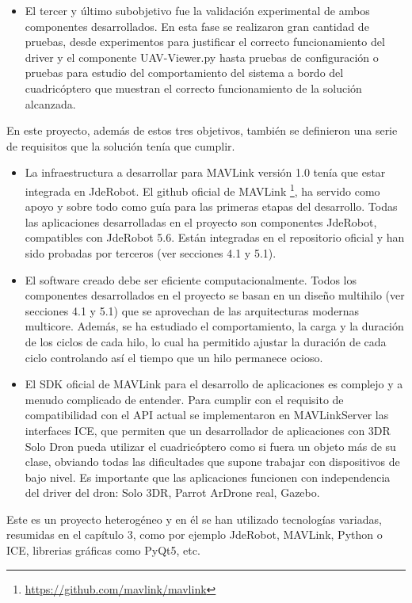 \begin{itemize}
\item El tercer y último subobjetivo fue la validación experimental de ambos componentes desarrollados. En esta fase se realizaron gran cantidad de pruebas, desde experimentos para justificar el correcto funcionamiento del driver y el componente UAV-Viewer.py hasta pruebas de configuración o pruebas para estudio del comportamiento del sistema a bordo del cuadricóptero que muestran el correcto funcionamiento de la solución alcanzada.

\end{itemize}

En este proyecto, además de estos tres objetivos, también se definieron una serie de requisitos que la solución tenía que cumplir.

\begin{itemize}
\item La infraestructura a desarrollar para MAVLink versión 1.0 tenía que estar integrada en JdeRobot. El github oficial de MAVLink \footnote{\url{https://github.com/mavlink/mavlink}}, ha servido como apoyo y sobre todo como guía para las primeras etapas del desarrollo. Todas las aplicaciones desarrolladas en el proyecto son componentes JdeRobot, compatibles con JdeRobot 5.6. Están integradas en el repositorio oficial y han sido probadas por terceros (ver secciones 4.1 y 5.1).
\item El software creado debe ser eficiente computacionalmente. Todos los componentes desarrollados en el proyecto se basan en un diseño multihilo (ver secciones 4.1 y 5.1) que se aprovechan de las arquitecturas modernas multicore. Además, se ha estudiado el comportamiento, la carga y la duración de los ciclos de cada hilo, lo cual ha permitido ajustar la duración de cada ciclo controlando así el tiempo que un hilo permanece ocioso.
\item El SDK oficial de MAVLink para el desarrollo de aplicaciones es complejo y a menudo complicado de entender. Para cumplir con el requisito de compatibilidad con el API actual se implementaron en MAVLinkServer las interfaces ICE, que permiten que un desarrollador de aplicaciones con 3DR Solo Dron pueda utilizar el cuadricóptero como si fuera un objeto más de su clase, obviando todas las dificultades que supone trabajar con dispositivos de bajo nivel. Es importante que las aplicaciones funcionen con independencia del driver del dron: Solo 3DR, Parrot ArDrone real, Gazebo.

\end{itemize}

Este es un proyecto heterogéneo y en él se han utilizado tecnologías variadas, resumidas en el capítulo 3, como por ejemplo JdeRobot, MAVLink, Python o ICE, librerias gráficas como PyQt5, etc.

